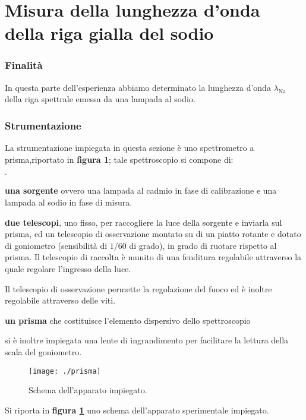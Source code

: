 \newpage
\part{Misura della lunghezza d'onda della riga gialla del sodio}
\section{Finalità}
	In questa parte dell'esperienza abbiamo determinato la lunghezza d’onda $\lambda_{\text{Na}}$ della riga spettrale
	emessa da una lampada al sodio.
\section{Strumentazione}\label{sez:str_a}
	La strumentazione impiegata in questa sezione è uno spettrometro a
	prisma,riportato in \textbf{figura 1};
	tale spettroscopio si compone di:
	\begin{list}{$\cdot$}{}
		\item \textbf{una sorgente } ovvero una lampada al cadmio in fase
		di
		calibrazione e una lampada al sodio in fase di misura.
		\item \textbf{due telescopi}, uno fisso, per raccogliere la luce
		della
		sorgente e inviarla sul prisma, ed un telescopio di osservazione
		montato su di un piatto rotante e dotato di goniometro
		(sensibilità di $1/60$ di grado), in grado di ruotare
		rispetto al prisma.
		Il telescopio di raccolta  è munito di una fenditura regolabile
		attraverso la quale regolare l'ingresso della luce.

		Il telescopio di osservazione permette la regolazione del fuoco
		ed è
		inoltre regolabile attraverso delle viti.
		\item \textbf{un prisma} che costituisce l'elemento dispersivo
		dello
		spettroscopio
	\end{list}
	\bigskip
	si è inoltre impiegata una lente di ingrandimento per facilitare la
	lettura della scala del goniometro.

	\bigskip


	\begin{figure} [h]
		\centering
		\texttt{[image: ./prisma]}
		\caption{Schema dell'apparato impiegato.}
		\label{fig:prisma}
	\end{figure}
	Si riporta in \textbf{figura \ref{fig:prisma}} uno schema
	dell'apparato
	sperimentale impiegato.
